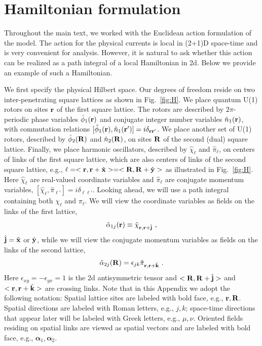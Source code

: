 \section{Hamiltonian formulation}
\label{app:H}
Throughout the main text, we worked with the Euclidean action formulation of the model.  The action for the physical currents is local in (2+1)D space-time and is very convenient for analysis.  However, it is natural to ask whether this action can be realized as a path integral of a local Hamiltonian in 2d.\cite{Matthew_Alexei_thanks}  Below we provide an example of such a Hamiltonian.

We first specify the physical Hilbert space.  Our degrees of freedom reside on two inter-penetrating square lattices as shown in Fig.~\ref{fig:H}.  We place quantum U(1) rotors on sites ${\bf r}$ of the first square lattice.  The rotors are described by $2\pi$-periodic phase variables $\hat{\phi}_1({\bf r})$ and conjugate integer number variables $\hat{n}_1({\bf r})$, with commutation relations $[\hat{\phi}_1({\bf r}), \hat{n}_1({\bf r}')] = i \delta_{{\bf r}{\bf r}'}$.  We place another set of U(1) rotors, described by $\hat{\phi}_2({\bf R})$ and $\hat{n}_2({\bf R})$, on sites ${\bf R}$ of the second (dual) square lattice.  Finally, we place harmonic oscillators, described by $\hat{\chi}_\ell$ and $\hat{\pi}_\ell$, on centers of links of the first square lattice, which are also centers of links of the second square lattice, e.g., $\ell = <{\bf r}, {\bf r} + \hat{{\bf x}}> = <{\bf R}, {\bf R} + \hat{{\bf y}}>$ as illustrated in Fig.~\ref{fig:H}.  Here $\hat{\chi}_\ell$ are real-valued coordinate variables and $\hat{\pi}_\ell$ are conjugate momentum variables, $[\hat{\chi}_\ell, \hat{\pi}_{\ell'}] = i\delta_{\ell\ell'}$.  Looking ahead, we will use a path integral containing both $\chi_\ell$ and $\pi_\ell$.  We will view the coordinate variables as fields on the links of the first lattice,
\begin{equation}
\hat{\alpha}_{1j}({\bf r}) \equiv \hat{\chi}_{{\bf r}, {\bf r} + \hat{{\bf j}}} ~,
\end{equation}
$\hat{{\bf j}} = \hat{{\bf x}}$ or $\hat{{\bf y}}$, while we will view the conjugate momentum variables as fields on the links of the second lattice,
\begin{equation}
\hat{\alpha}_{2j}({\bf R}) = \epsilon_{jk} \hat{\pi}_{{\bf r}, {\bf r} + \hat{{\bf k}}} ~.
\end{equation}
Here $\epsilon_{xy} = -\epsilon_{yx} = 1$ is the 2d antisymmetric tensor and $<{\bf R}, {\bf R} + \hat{{\bf j}}>$ and $<{\bf r}, {\bf r} + \hat{{\bf k}}>$ are crossing links.\cite{footnoteKitaev}
Note that in this Appendix we adopt the following notation:  Spatial lattice sites are labeled with bold face, e.g., ${\bf r}, {\bf R}$.  Spatial directions are labeled with Roman letters, e.g., $j, k$; space-time directions that appear later will be labeled with Greek letters, e.g., $\mu, \nu$.  Oriented fields residing on spatial links are viewed as spatial vectors and are labeled with bold face, e.g., ${\bm \alpha_1}, {\bm \alpha_2}$.

